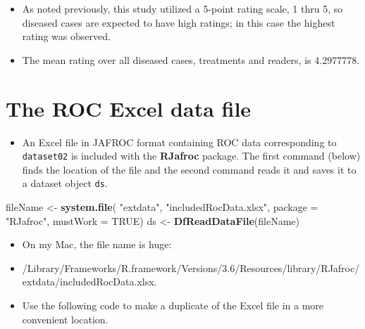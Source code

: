 \documentclass[]{book}
\newenvironment{Shaded}{\begin{snugshade}}{\end{snugshade}}
\newcommand{\CommentTok}[1]{\textcolor[rgb]{0.56,0.35,0.01}{\textit{#1}}}
\newcommand{\DataTypeTok}[1]{\textcolor[rgb]{0.13,0.29,0.53}{#1}}
\newcommand{\DecValTok}[1]{\textcolor[rgb]{0.00,0.00,0.81}{#1}}
\newcommand{\KeywordTok}[1]{\textcolor[rgb]{0.13,0.29,0.53}{\textbf{#1}}}
\newcommand{\NormalTok}[1]{#1}
\newcommand{\OperatorTok}[1]{\textcolor[rgb]{0.81,0.36,0.00}{\textbf{#1}}}
\newcommand{\OtherTok}[1]{\textcolor[rgb]{0.56,0.35,0.01}{#1}}
\newcommand{\StringTok}[1]{\textcolor[rgb]{0.31,0.60,0.02}{#1}}
\providecommand{\tightlist}{%
  \setlength{\itemsep}{0pt}\setlength{\parskip}{0pt}}
\begin{document}
\begin{Shaded}
\end{Shaded}

\begin{itemize}
\tightlist
\item
  As noted previously, this study utilized a 5-point rating scale, 1 thru 5, so diseased cases are expected to have high ratings; in this case the highest rating was observed.
\item
  The mean rating over all diseased cases, treatments and readers, is 4.2977778.
\end{itemize}

\hypertarget{the-roc-excel-data-file}{%
\section{The ROC Excel data file}\label{the-roc-excel-data-file}}

\begin{itemize}
\tightlist
\item
  An Excel file in JAFROC format containing ROC data corresponding to \texttt{dataset02} is included with the \textbf{RJafroc} package. The first command (below) finds the location of the file and the second command reads it and saves it to a dataset object \texttt{ds}.
\end{itemize}

\begin{Shaded}
\begin{Highlighting}[]
\NormalTok{fileName <-}\StringTok{ }\KeywordTok{system.file}\NormalTok{(}
    \StringTok{"extdata"}\NormalTok{, }\StringTok{"includedRocData.xlsx"}\NormalTok{, }\DataTypeTok{package =} \StringTok{"RJafroc"}\NormalTok{, }\DataTypeTok{mustWork =} \OtherTok{TRUE}\NormalTok{)}
\NormalTok{ds <-}\StringTok{ }\KeywordTok{DfReadDataFile}\NormalTok{(fileName)}
\end{Highlighting}
\end{Shaded}

\begin{itemize}
\tightlist
\item
  On my Mac, the file name is huge:
\item
  /Library/Frameworks/R.framework/Versions/3.6/Resources/library/RJafroc/extdata/includedRocData.xlsx.
\item
  Use the following code to make a duplicate of the Excel file in a more convenient location.
\end{itemize}
\end{document}
